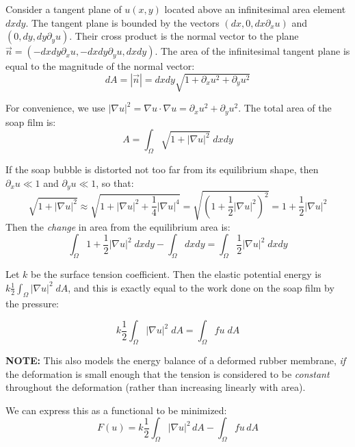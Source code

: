 \documentclass[12pt, a4paper, twoside, openright]{book}
\begin{document}
Consider a tangent plane of $u(x,y)$ located above an infinitesimal area element $dxdy$.  The tangent plane is bounded by the vectors $(dx,0,dx \partial_x u)$ and $(0,dy,dy \partial_y u)$. Their cross product is the normal vector to the plane\\
 $\vec{n} = (-dxdy \partial_x u, -dxdy \partial_y u, dxdy) $. The area of the infinitesimal tangent plane is equal to the magnitude of the normal vector:
\begin{equation}
dA = |\vec{n}| = dxdy \sqrt{1 + \partial_x u^2 + \partial_y u^2}
\end{equation}

For convenience, we use $|\nabla u|^2 = \nabla u \cdot \nabla u = \partial_x u^2 + \partial_y u^2  $.  The total area of the soap film is:
\begin{equation}
A =  \int_{\Omega} \sqrt{1 + |\nabla u|^2} \;dxdy
\end{equation}

If the soap bubble is distorted not too far from its equilibrium shape, then $\partial_x u \ll 1$ and $\partial_y u \ll 1$, so that:
\begin{equation}
\sqrt{1 + |\nabla u|^2} \approx \sqrt{1 + |\nabla u|^2 + \frac{1}{4} |\nabla u|^4}
= \sqrt{(1 + \frac{1}{2} |\nabla u|^2)^2}
= 1 + \frac{1}{2} |\nabla u|^2
\end{equation}
Then the \emph{change} in area from the equilibrium area is:
\begin{equation}
\int_{\Omega} 1 + \frac{1}{2} |\nabla u|^2 \;dxdy - \int_{\Omega} dxdy = 
\int_{\Omega} \frac{1}{2} |\nabla u|^2 \;dxdy
\end{equation}

Let $k$ be the surface tension coefficient.  Then the elastic potential energy is $k \frac{1}{2} \int_{\Omega}  |\nabla u|^2 \;dA $, and this is exactly equal to the work done on the soap film by the pressure:

\begin{equation}
k \frac{1}{2} \int_{\Omega} |\nabla u|^2 \;dA = \int_{\Omega} f u \;dA
\end{equation}

\vspace{1em}
\textbf{NOTE:}  This also models the energy balance of a deformed rubber membrane, \emph{if} the deformation is small enough that the tension is considered to be \emph{constant} throughout the deformation (rather than increasing linearly with area).

\vspace{2em}
We can express this as a functional to be minimized:
\begin{equation}
F(u) =  k \frac{1}{2} \int_{\Omega} |\nabla u|^2 \,dA - \int_{\Omega} f u \,dA
\end{equation}
\end{document}
